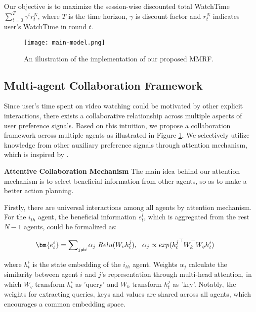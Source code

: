 Our objective is to maximize the session-wise discounted total WatchTime 
$\sum_{t=0}^T{\gamma^{t} r_t^N}$, where $T$ is the time horizon, $\gamma$ is discount factor and  $r_t^N$ indicates user's WatchTime in round $t$.



\begin{figure}[t]
\centering
\texttt{[image: main-model.png]}
\vspace{-2em}
\caption{An illustration of the implementation of our proposed MMRF.}
\label{main-model}
\vspace{-2em}
\end{figure}

\subsection{Multi-agent Collaboration Framework}
Since user's time spent on video watching could be motivated by other explicit interactions, there exists a collaborative relationship across multiple aspects of user preference signals. 
Based on this intuition, we propose a collaboration framework across multiple agents as illustrated in Figure \ref{main-model}. We selectively utilize knowledge from other auxiliary preference signals through attention mechanism, which is inspired by \cite{iqbal2019actor}.

\textbf{Attentive Collaboration Mechanism} 
The main idea behind our attention mechanism is to select beneficial information from other agents, so as to make a better action planning. 

Firstly, there are universal interactions among all agents by attention mechanism. For the $i_{th}$ agent, the beneficial information $e_t^i$, which is aggregated from the rest $N-1$ agents, could be formalized as:
\vspace{-0.3em}
\begin{small}
\begin{equation} \label{eq1}
\begin{aligned}
\setlength{\abovedisplayskip}{1pt}
&\bm{e_t^i} = \sum\nolimits_{j \neq i}{\alpha_j \ Relu(W_v h_t^j)}, \ \  \alpha_j \propto exp({h_t^j}^\top W_k^\top W_q h_t^i)
\setlength{\belowdisplayskip}{1pt}
\end{aligned}
\end{equation}
\end{small}
\vspace{-0.3em}
where $h_t^i$ is the state embedding of the $i_{th}$ agent. Weights $\alpha_j$ calculate the similarity between agent $i$ and $j$'s representation through multi-head attention, in which $W_q$ transform $h_t^i$ as 'query' and $W_k$ transform $h_t^j$ as 'key'. 
Notably, the weights for extracting queries, keys and values are shared across all agents, which encourages a common embedding space. 


